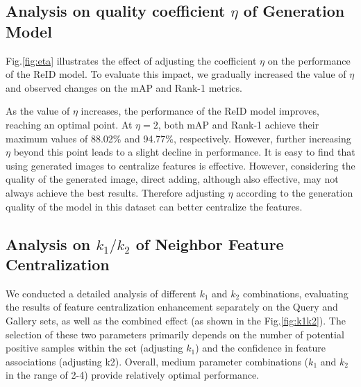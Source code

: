 

\subsection{Analysis on quality coefficient $\eta$ of Generation Model}

Fig.\ref{fig:eta} illustrates the effect of adjusting the coefficient $\eta$ on the performance of the ReID model. To evaluate this impact, we gradually increased the value of $\eta$ and observed changes on the mAP and Rank-1 metrics. 

As the value of $\eta$ increases, the performance of the ReID model improves, reaching an optimal point. At $\eta = 2$, both mAP and Rank-1 achieve their maximum values of 88.02\% and 94.77\%, respectively. However, further increasing $\eta$ beyond this point leads to a slight decline in performance. It is easy to find that using generated images to centralize features is effective. However, considering the quality of the generated image, direct adding, although also effective, may not always achieve the best results. Therefore adjusting $\eta$ according to the generation quality of the model in this dataset can better centralize the features.


\subsection{Analysis on $k_1/k_2$ of Neighbor Feature Centralization}
We conducted a detailed analysis of different $k_1$ and $k_2$ combinations, evaluating the results of feature centralization enhancement separately on the Query and Gallery sets, as well as the combined effect (as shown in the Fig.\ref{fig:k1k2}). The selection of these two parameters primarily depends on the number of potential positive samples within the set (adjusting $k_1$) and the confidence in feature associations (adjusting k2). Overall, medium parameter combinations ($k_1$ and $k_2$ in the range of 2-4) provide relatively optimal performance.




























